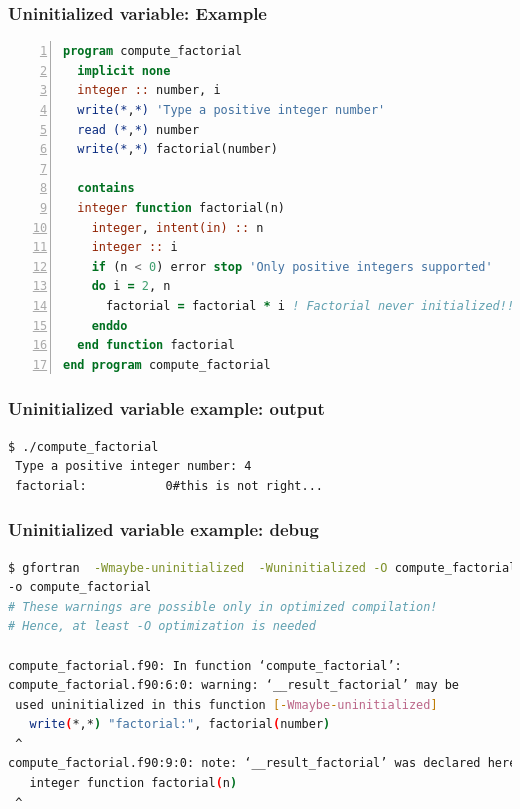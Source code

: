 \documentclass[t]{myBeamer}
\begin{document}
\begin{frame}[fragile,t]
\frametitle{ Uninitialized variable: Example }
\vspace{-10pt}
\begin{lstlisting}[language=fortran,numbers=left]
program compute_factorial
  implicit none 
  integer :: number, i
  write(*,*) 'Type a positive integer number'
  read (*,*) number
  write(*,*) factorial(number)

  contains
  integer function factorial(n)
	integer, intent(in) :: n
	integer :: i
	if (n < 0) error stop 'Only positive integers supported'
	do i = 2, n
	  factorial = factorial * i ! Factorial never initialized!!
	enddo
  end function factorial
end program compute_factorial
\end{lstlisting}

\end{frame}

\begin{frame}[fragile,t]
\frametitle{ Uninitialized variable example: output }
\vspace{-10pt}
\begin{lstlisting}[language=bash]
$ ./compute_factorial 
 Type a positive integer number: 4
 factorial:           0#this is not right...
\end{lstlisting}

\end{frame}



\begin{frame}[fragile,t]
\frametitle{ Uninitialized variable example: debug }

\begin{lstlisting}[language=bash]
$ gfortran  -Wmaybe-uninitialized  -Wuninitialized -O compute_factorial.f90
-o compute_factorial
# These warnings are possible only in optimized compilation!
# Hence, at least -O optimization is needed

compute_factorial.f90: In function ‘compute_factorial’:
compute_factorial.f90:6:0: warning: ‘__result_factorial’ may be 
 used uninitialized in this function [-Wmaybe-uninitialized]
   write(*,*) "factorial:", factorial(number)
 ^
compute_factorial.f90:9:0: note: ‘__result_factorial’ was declared here
   integer function factorial(n)
 ^

\end{lstlisting}


\end{frame}
\end{document}
